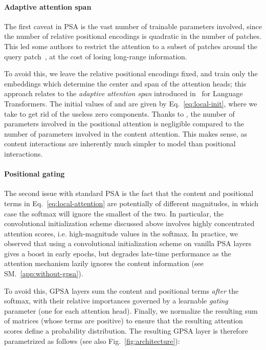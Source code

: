 \paragraph{Adaptive attention span} The first caveat in PSA is the vast number of trainable parameters involved, since the number of relative positional encodings  is quadratic in the number of patches. This led some authors to restrict the attention to a subset of patches around the query patch~\cite{ramachandran2019stand}, at the cost of losing long-range information. 

To avoid this, we leave the relative positional encodings  fixed, and train only the embeddings  which determine the center and span of the attention heads; this approach relates to the \emph{adaptive attention span} introduced in~\citet{sukhbaatar2019adaptive} for Language Transformers. The initial values of  and  are given by Eq.~\ref{eq:local-init}, where we take  to get rid of the useless zero components. Thanks to , the number of parameters involved in the positional attention is negligible compared to the number of parameters involved in the content attention. This makes sense, as content interactions are inherently much simpler to model than positional interactions.

\paragraph{Positional gating} 
The second issue with standard PSA is the fact that the content and positional terms in Eq.~\ref{eq:local-attention} are potentially of different magnitudes, in which case the softmax will ignore the smallest of the two. In particular, the convolutional initialization scheme discussed above involves highly concentrated attention scores, i.e. high-magnitude values in the softmax. In practice, we observed that using a convolutional initialization scheme on vanilla PSA layers gives a boost in early epochs, but degrades late-time performance as the attention mechanism lazily ignores the content information (see SM.~\ref{app:without-gpsa}). 

To avoid this, GPSA layers sum the content and positional terms \emph{after} the softmax, with their relative importances governed by a learnable \emph{gating} parameter  (one for each attention head). Finally, we normalize the resulting sum of matrices (whose terms are positive) to ensure that the resulting attention scores define a probability distribution. The resulting GPSA layer is therefore parametrized as follows (see also Fig.~\ref{fig:architecture}):

